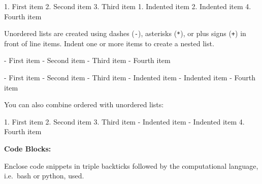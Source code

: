 \documentclass[
  letterpaper,
  DIV=11,
  numbers=noendperiod]{scrreprt}
\newenvironment{Shaded}{}{}
\newcommand{\NormalTok}[1]{\textcolor[rgb]{0.14,0.16,0.18}{#1}}
\newcommand{\SpecialStringTok}[1]{\textcolor[rgb]{0.01,0.18,0.38}{#1}}
\begin{document}
\begin{Shaded}
\begin{Highlighting}[]
\SpecialStringTok{1. }\NormalTok{First item}
\SpecialStringTok{2. }\NormalTok{Second item}
\SpecialStringTok{3. }\NormalTok{Third item}
\SpecialStringTok{    1. }\NormalTok{Indented item}
\SpecialStringTok{    2. }\NormalTok{Indented item}
\SpecialStringTok{4. }\NormalTok{Fourth item }
\end{Highlighting}
\end{Shaded}

Unordered lists are created using dashes (\texttt{-}), asterisks
(\texttt{*}), or plus signs (\texttt{+}) in front of line items. Indent
one or more items to create a nested list.

\begin{Shaded}
\begin{Highlighting}[]
\SpecialStringTok{{-} }\NormalTok{First item}
\SpecialStringTok{{-} }\NormalTok{Second item}
\SpecialStringTok{{-} }\NormalTok{Third item}
\SpecialStringTok{{-} }\NormalTok{Fourth item }
\end{Highlighting}
\end{Shaded}

\begin{Shaded}
\begin{Highlighting}[]
\SpecialStringTok{ {-} }\NormalTok{First item}
\SpecialStringTok{{-} }\NormalTok{Second item}
\SpecialStringTok{{-} }\NormalTok{Third item}
\SpecialStringTok{    {-} }\NormalTok{Indented item}
\SpecialStringTok{    {-} }\NormalTok{Indented item}
\SpecialStringTok{{-} }\NormalTok{Fourth item }
\end{Highlighting}
\end{Shaded}

You can also combine ordered with unordered lists:

\begin{Shaded}
\begin{Highlighting}[]
\SpecialStringTok{1. }\NormalTok{First item}
\SpecialStringTok{2. }\NormalTok{Second item}
\SpecialStringTok{3. }\NormalTok{Third item}
\SpecialStringTok{    {-} }\NormalTok{Indented item}
\SpecialStringTok{    {-} }\NormalTok{Indented item}
\SpecialStringTok{4. }\NormalTok{Fourth item}
\end{Highlighting}
\end{Shaded}

\textbf{Code Blocks:}

Enclose code snippets in triple backticks followed by the computational
language, i.e.~bash or python, used.
\end{document}
